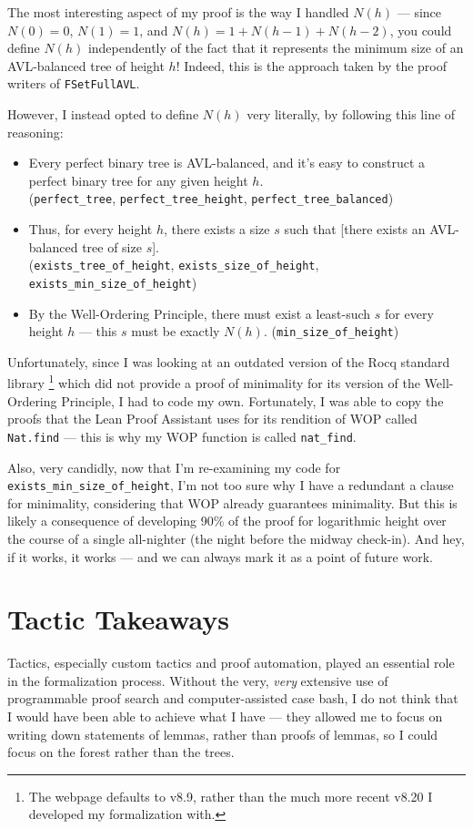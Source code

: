 \documentclass[acmsmall, authorversion, nonacm, overload]{acmart}
\begin{document}
The most interesting aspect of my proof
is the way I handled $N(h)$ --- since $N(0) = 0$, $N(1) = 1$, and $N(h) = 1 + N(h - 1) + N(h - 2)$,
you could define $N(h)$ independently of the fact that it represents the minimum size of an AVL-balanced tree
of height $h$!
Indeed, this is the approach taken by the proof writers of \verb|FSetFullAVL|.

However, I instead opted to define $N(h)$ very literally, by following this line of reasoning:
\begin{itemize}
\item Every perfect binary tree is AVL-balanced,
  and it's easy to construct a perfect binary tree for any given height $h$. \\
  (\verb|perfect_tree|, \verb|perfect_tree_height|, \verb|perfect_tree_balanced|)
\item Thus, for every height $h$, there exists a size $s$ such that
  [there exists an AVL-balanced tree of size $s$]. \\
  (\verb|exists_tree_of_height|, \verb|exists_size_of_height|, \verb|exists_min_size_of_height|)
\item By the Well-Ordering Principle,
  there must exist a least-such $s$ for every height $h$ ---
  this $s$ must be exactly $N(h)$.
  (\verb|min_size_of_height|)
\end{itemize}
Unfortunately, since I was looking at an outdated version of the Rocq standard library
\footnote{The webpage defaults to v8.9, rather than the much more recent v8.20 I developed my formalization with.}
which did not provide a proof of minimality for its version of the Well-Ordering Principle,
I had to code my own.
Fortunately, I was able to copy the proofs that the Lean Proof Assistant uses for its rendition of WOP
called \verb|Nat.find| --- this is why my WOP function is called \verb|nat_find|.

Also, very candidly, now that I'm re-examining my code for \verb|exists_min_size_of_height|,
I'm not too sure why I have a redundant a clause for minimality,
considering that WOP already guarantees minimality.
But this is likely a consequence of developing 90\% of the proof for logarithmic height over the course of
a single all-nighter (the night before the midway check-in).
And hey, if it works, it works --- and we can always mark it as a point of future work.

\section{Tactic Takeaways}
Tactics, especially custom tactics and proof automation, played an essential role
in the formalization process.
Without the very, \emph{very} extensive use of
programmable proof search and computer-assisted case bash,
I do not think that I would have been able to achieve what I have ---
they allowed me to focus on writing down statements of lemmas, rather than proofs of lemmas,
so I could focus on the forest rather than the trees.
\end{document}
